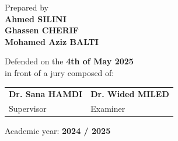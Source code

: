 \vspace{0.8cm} %

\begin{center}
  Prepared by \\[0.15cm]
  \textbf{Ahmed SILINI} \\
  \textbf{Ghassen CHERIF} \\
  \textbf{Mohamed Aziz BALTI}
\end{center}

\vspace{0.8cm} %

\begin{center}
  Defended on the \textbf{4th of May 2025} \\
  in front of a jury composed of:
\end{center}

\vspace{0.4cm} %

\begin{center}
\begin{tabular}{m{6cm} m{6cm}}
\centering\arraybackslash \textbf{Dr. Sana HAMDI} & \centering\arraybackslash \textbf{Dr. Wided MILED} \\
\centering\arraybackslash Supervisor & \centering\arraybackslash Examiner \\
\end{tabular}
\end{center}

\vspace{0.6cm} %

\begin{center}
  Academic year: \textbf{2024 / 2025}
\end{center}
